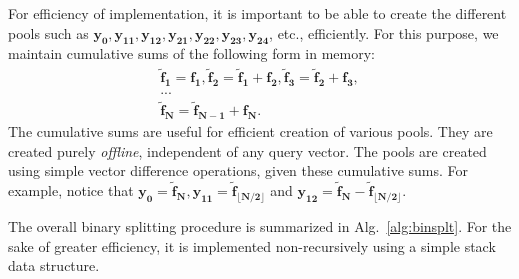 \documentclass[sigconf, anonymous, review]{acmart}
\begin{document}
For efficiency of implementation, it is important to be able to create the different pools such as $\boldsymbol{y_0}, \boldsymbol{y_{11}}, \boldsymbol{y_{12}}, \boldsymbol{y_{21}}, \boldsymbol{y_{22}}, \boldsymbol{y_{23}}, \boldsymbol{y_{24}}$, etc., efficiently. For this purpose, we maintain cumulative sums of the following form in memory:
\begin{eqnarray}
\boldsymbol{\widetilde{f}_1} = \boldsymbol{f_1}, 
\boldsymbol{\widetilde{f}_2} = \boldsymbol{\widetilde{f}_1} + \boldsymbol{f_2}, 
\boldsymbol{\widetilde{f}_3} = \boldsymbol{\widetilde{f}_2} + \boldsymbol{f_3}, \nonumber \\
...\nonumber\\
\boldsymbol{\widetilde{f}_N} = \boldsymbol{\widetilde{f}_{N-1}} + \boldsymbol{f_N}. 
\label{eq:cumsums}
\end{eqnarray}
The cumulative sums are useful for efficient creation of various pools. They are created purely \emph{offline}, independent of any query vector. The pools are created using simple vector difference operations, given these cumulative sums. For example, notice that $\boldsymbol{y_0} = \boldsymbol{\widetilde{f}_N}, \boldsymbol{y_{11}} = \boldsymbol{\widetilde{f}_{\lfloor N/2 \rfloor}}$ and $\boldsymbol{y_{12}} = \boldsymbol{\widetilde{f}_N} - \boldsymbol{\widetilde{f}_{\lfloor N/2 \rfloor}}$. 

The overall binary splitting procedure is summarized in Alg.~\ref{alg:binsplt}. For the sake of greater efficiency, it is implemented non-recursively using a simple stack data structure. 
\end{document}
